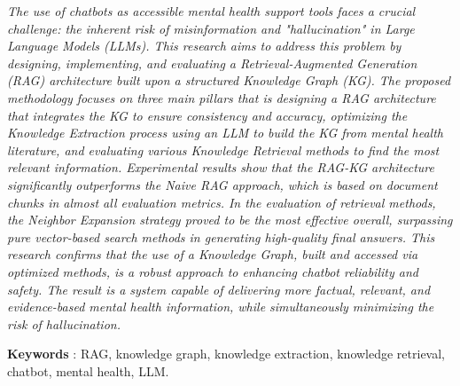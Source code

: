 \textit{
	The use of chatbots as accessible mental health support tools faces a crucial challenge: the inherent risk of misinformation and "hallucination" in Large Language Models (LLMs).
	This research aims to address this problem by designing, implementing, and evaluating a Retrieval-Augmented Generation (RAG) architecture built upon a structured Knowledge Graph (KG).
	The proposed methodology focuses on three main pillars that is designing a RAG architecture that integrates the KG to ensure consistency and accuracy, optimizing the Knowledge Extraction process using an LLM to build the KG from mental health literature, and evaluating various Knowledge Retrieval methods to find the most relevant information.
	Experimental results show that the RAG-KG architecture significantly outperforms the Naive RAG approach, which is based on document chunks in almost all evaluation metrics.
	In the evaluation of retrieval methods, the Neighbor Expansion strategy proved to be the most effective overall, surpassing pure vector-based search methods in generating high-quality final answers.
	This research confirms that the use of a Knowledge Graph, built and accessed via optimized methods, is a robust approach to enhancing chatbot reliability and safety.
	The result is a system capable of delivering more factual, relevant, and evidence-based mental health information, while simultaneously minimizing the risk of hallucination.
}

\noindent\textbf{Keywords} : RAG, knowledge graph, knowledge extraction, knowledge retrieval, chatbot, mental health, LLM.